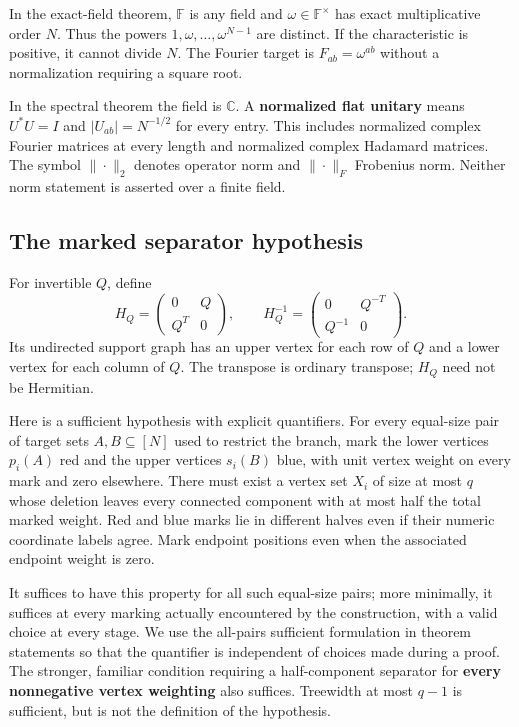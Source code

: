 \documentclass[
  11pt,
]{article}
\begin{document}
In the exact-field theorem, \(\mathbb F\) is any field and
\(\omega\in\mathbb F^\times\) has exact multiplicative order \(N\). Thus
the powers \(1,\omega,\ldots,\omega^{N-1}\) are distinct. If the
characteristic is positive, it cannot divide \(N\). The Fourier target
is \(F_{ab}=\omega^{ab}\) without a normalization requiring a square
root.

In the spectral theorem the field is \(\mathbb C\). A \textbf{normalized
flat unitary} means \(U^*U=I\) and \(|U_{ab}|=N^{-1/2}\) for every
entry. This includes normalized complex Fourier matrices at every length
and normalized complex Hadamard matrices. The symbol \(\|\cdot\|_2\)
denotes operator norm and \(\|\cdot\|_F\) Frobenius norm. Neither norm
statement is asserted over a finite field.

\subsection{The marked separator
hypothesis}\label{the-marked-separator-hypothesis}

For invertible \(Q\), define \[
 H_Q=\begin{pmatrix}0&Q\\Q^T&0\end{pmatrix},\qquad
 H_Q^{-1}=\begin{pmatrix}0&Q^{-T}\\Q^{-1}&0\end{pmatrix}.      \tag{4}
\] Its undirected support graph has an upper vertex for each row of
\(Q\) and a lower vertex for each column of \(Q\). The transpose is
ordinary transpose; \(H_Q\) need not be Hermitian.

Here is a sufficient hypothesis with explicit quantifiers. For every
equal-size pair of target sets \(A,B\subseteq[N]\) used to restrict the
branch, mark the lower vertices \(p_i(A)\) red and the upper vertices
\(s_i(B)\) blue, with unit vertex weight on every mark and zero
elsewhere. There must exist a vertex set \(X_i\) of size at most \(q\)
whose deletion leaves every connected component with at most half the
total marked weight. Red and blue marks lie in different halves even if
their numeric coordinate labels agree. Mark endpoint positions even when
the associated endpoint weight is zero.

It suffices to have this property for all such equal-size pairs; more
minimally, it suffices at every marking actually encountered by the
construction, with a valid choice at every stage. We use the all-pairs
sufficient formulation in theorem statements so that the quantifier is
independent of choices made during a proof. The stronger, familiar
condition requiring a half-component separator for \textbf{every
nonnegative vertex weighting} also suffices. Treewidth at most \(q-1\)
is sufficient, but is not the definition of the hypothesis.
\end{document}

